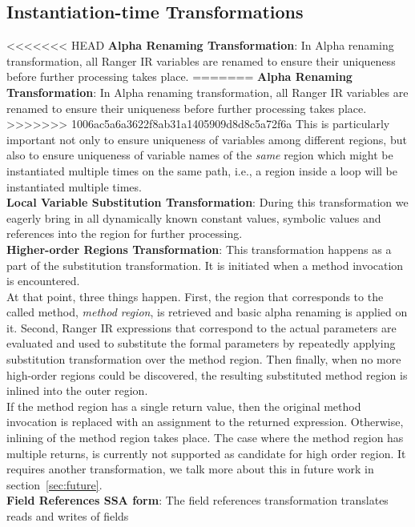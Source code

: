 \subsection{Instantiation-time Transformations}
<<<<<<< HEAD
\label{sec:instantiationTransformations}
\textbf{Alpha Renaming Transformation}: In Alpha renaming transformation, all Ranger IR variables are renamed to ensure their uniqueness before further processing takes place. 
=======
\textbf{Alpha Renaming Transformation}: In Alpha renaming transformation, all Ranger IR variables are renamed to ensure their uniqueness before further processing takes place.
>>>>>>> 1006ac5a6a3622f8ab31a1405909d8d8c5a72f6a
%
This is particularly important not only to ensure uniqueness of variables among different regions, but also to ensure uniqueness of variable names of the \textit{same} region which might be instantiated multiple times on the same path, i.e., a region inside a loop will be instantiated multiple times.\\
%
\textbf{Local Variable Substitution Transformation}: During this transformation we eagerly bring in all dynamically known constant values, symbolic values and references into the region for further processing. \\
%
\textbf{Higher-order Regions Transformation}: This transformation happens as a part of the substitution transformation.
%
It is initiated when a method invocation is encountered.\\
%
At that point, three things happen.
%
First, the region that corresponds to the called method, \textit{method region}, is retrieved and basic alpha renaming is applied on it.
%
Second, Ranger IR expressions that correspond to the actual parameters are evaluated and used to substitute the formal parameters by repeatedly applying substitution transformation over the method region.
%
Then finally, when no more high-order regions could be discovered, the resulting substituted method region is inlined into the outer region.\\
%
If the method region has a single return value, then the original method invocation is replaced with an assignment to the returned expression.
%
Otherwise, inlining of the method region takes place.
%
The case where the method region has multiple returns, is currently not supported as candidate for high order region.
%
It requires another transformation, we talk more about this in future work in section~\ref{sec:future}.
\\
\textbf{Field References SSA form}: The field references transformation translates reads and writes of fields
